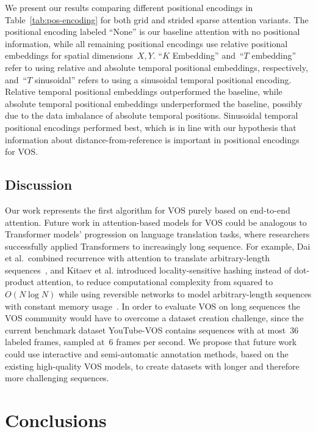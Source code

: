 We present our results comparing different positional encodings in
Table~\ref{tab:pos-encoding} for both grid and strided sparse attention
variants.
The positional encoding labeled ``None'' is our baseline attention with no
positional information, while all remaining positional encodings use relative
positional embeddings for spatial dimensions~$X, Y$.
``$K$ Embedding'' and~``$T$ embedding'' refer to using relative and absolute
temporal positional embeddings, respectively, and~``$T$ sinusoidal'' refers to
using a sinusoidal temporal positional encoding.
Relative temporal positional embeddings outperformed the baseline, while
absolute temporal positional embeddings underperformed the baseline, possibly
due to the data imbalance of absolute temporal positions.
Sinusoidal temporal positional encodings performed best, which is in line with
our hypothesis that information about distance-from-reference is important in
positional encodings for VOS\@.



\subsection{Discussion}

Our work represents the first algorithm for VOS purely based on end-to-end
attention.
Future work in attention-based models for VOS could be analogous to Transformer
models' progression on language translation tasks, where researchers
successfully applied Transformers to increasingly long sequence.
For example, Dai et al.\ combined recurrence with attention to translate
arbitrary-length sequences~\cite{dai2019transformer}, and Kitaev et al.
introduced locality-sensitive hashing instead of dot-product attention, to
reduce computational complexity from squared to~$O(N\log N)$ while using
reversible networks to model arbitrary-length sequences with constant memory
usage~\cite{kitaev2020reformer}.
In order to evaluate VOS on long sequences the VOS community would have to
overcome a dataset creation challenge, since the current benchmark dataset
YouTube-VOS contains sequences with at most~\num{36} labeled frames, sampled
at~\num{6} frames per second.
We propose that future work could use interactive and semi-automatic annotation
methods, based on the existing high-quality VOS models, to create datasets with
longer and therefore more challenging sequences.


\section{Conclusions}

